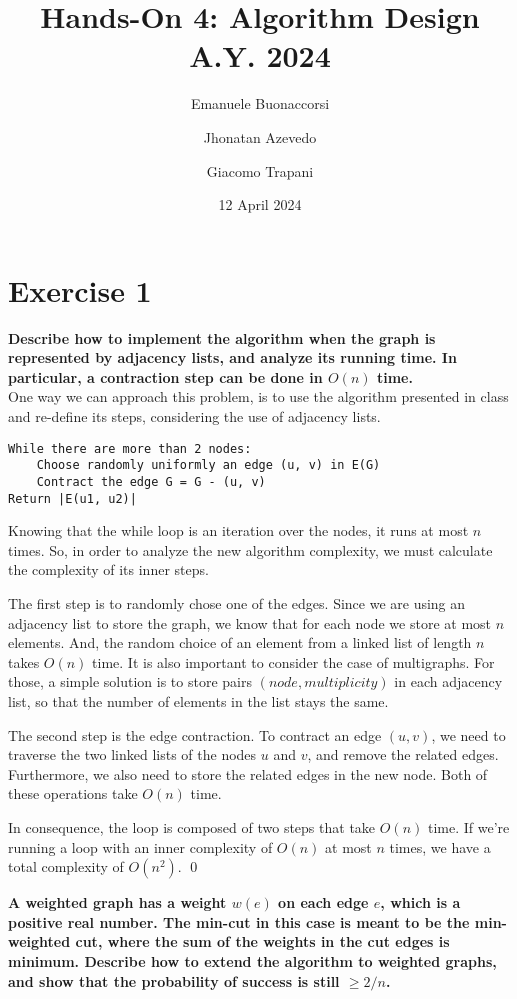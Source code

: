 \documentclass{article}
\title{Hands-On 4: Algorithm Design A.Y. 2024}
\author{Emanuele Buonaccorsi \and Jhonatan Azevedo \and Giacomo Trapani}
\date{12 April 2024}
\begin{document}
\maketitle


\section{Exercise 1}

\textbf{Describe how to implement the algorithm when the graph is represented by adjacency lists, and analyze its running time. In particular, a contraction step can be done in \(O(n)\) time.}
\\

One way we can approach this problem, is to use the algorithm presented in class and re-define its steps, considering the use of adjacency lists.

\begin{verbatim}
While there are more than 2 nodes:
	Choose randomly uniformly an edge (u, v) in E(G)
	Contract the edge G = G - (u, v)
Return |E(u1, u2)|
\end{verbatim}

Knowing that the while loop is an iteration over the nodes, it runs at most \(n\) times. So, in order to analyze the new algorithm complexity, we must calculate the complexity of its inner steps.

The first step is to randomly chose one of the edges. Since we are using an adjacency list to store the graph, we know that for each node we store at most \(n\) elements. And, the random choice of an element from a linked list of length \(n\) takes \(O(n)\) time. It is also important to consider the case of  multigraphs. For those, a simple solution is to store pairs \((node, multiplicity)\) in each adjacency list, so that the number of elements in the list stays the same.

The second step is the edge contraction. To contract an edge \((u, v)\), we need to traverse the two linked lists of the nodes \(u\) and \(v\), and remove the related edges. Furthermore, we also need to store the related edges in the new node. Both of these operations take \(O(n)\) time.

In consequence, the loop is composed of two steps that take \(O(n)\) time. If we're running a loop with an inner complexity of \(O(n)\) at most \(n\) times, we have a total complexity of \(O(n^2)\). \qed

\pagebreak

\textbf{A weighted graph has a weight \(w(e)\) on each edge \(e\), which is a positive real number. The min-cut in this case is meant to be the min-weighted cut, where the sum of the weights in the cut edges is minimum. Describe how to extend the algorithm to weighted graphs, and show that the probability of success is still \(\geq 2/n\).}
\\
\end{document}
